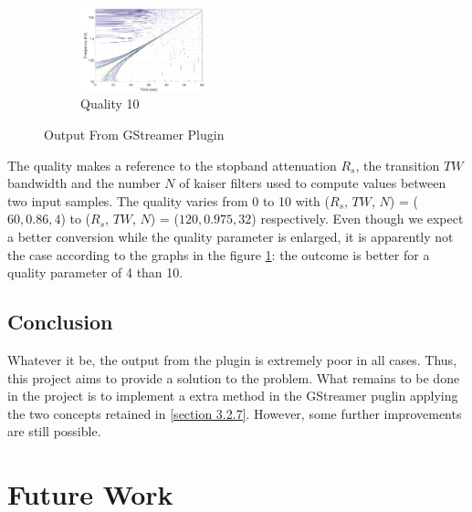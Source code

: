 \begin{figure}[ht!] \ContinuedFloat
	\begin{subfigure}[b]{\textwidth}
		\centering 
		\includegraphics[height = 0.35\textwidth, width = 0.4\textwidth]{gstreamer_q10.png}
		\caption{Quality 10}
	\end{subfigure}

\caption{Output From GStreamer Plugin}
\label{Figure 3.29}
\end{figure}

\newpage

The quality makes a reference to the stopband attenuation $R_{s}$, the transition $TW$ bandwidth and the number $N$ of kaiser filters used to compute values between two input samples. The quality varies from 0 to 10 with ($R_{s}$, $TW$, $N$)  = ($60, 0.86, 4$) to ($R_{s}$, $TW$, $N$)  = ($120, 0.975, 32$) respectively. Even though we expect a better conversion while the quality parameter is enlarged, it is apparently not the case according to the graphs in the figure \ref{Figure 3.29}: the outcome is better for a quality parameter of 4 than 10.


\subsection{Conclusion}
Whatever it be, the output from the plugin is extremely poor in all cases. Thus, this project aims to provide a solution to the problem. What remains to be done in the project is to implement a extra method in the GStreamer puglin applying the two concepts retained in \ref{section 3.2.7}. However, some further improvements are still possible.



\section{Future Work}

